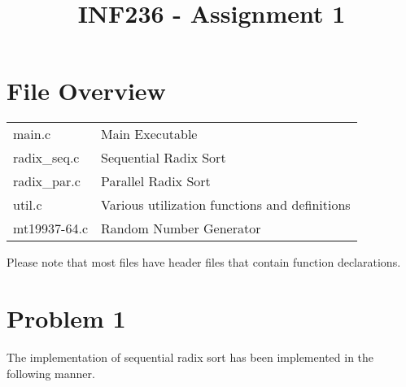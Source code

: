 \documentclass{article}
\title{INF236 - Assignment 1}
\begin{document}
\maketitle
\newpage
\tableofcontents
\newpage
    \section{File Overview}
    \begin{table}[H]
        \begin{center}
            \begin{tabular}[c]{|l|l|}
                \hline
                main.c & Main Executable \\
                radix\_seq.c & Sequential Radix Sort  \\
                radix\_par.c & Parallel Radix Sort  \\
                util.c & Various utilization functions and definitions  \\
                mt19937-64.c & Random Number Generator\\
                \hline
            \end{tabular}
        \end{center}
    \end{table}

        Please note that most files have header files that contain function declarations.

        \medskip

        \begin{center}
        \end{center}
        \medskip
    
    \section*{Problem 1}

    The implementation of sequential radix sort has been implemented in the following manner.
\end{document}
